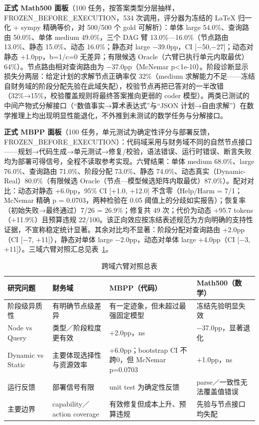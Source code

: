 \textbf{正式 Math500 面板}（100 任务，按答案类型分层抽样，FROZEN\_BEFORE\_EXECUTION，534 次调用，评分器为冻结的 LaTeX 归一化 + sympy 精确等价，对 500/500 个 gold 可解析）：单体 large 54.0\%、查询路由 50.0\%、单体 medium 49.0\%，三个 DAG 臂 13.0\%---16.0\%（节点路由 13.0\%、静态 15.0\%、动态 16.0\%；静态对 large −39.0pp，CI {[}−50,−27{]}；动态对静态 +1.0pp，b=1/c=0 无差异；有限候选 Oracle（六臂已执行单元内取最优）64\%）。节点路由相对查询路由为 −37.0pp（McNemar p\textless1e-10）。阶段诊断显示损失分两层：给定计划的求解节点正确率仅 32\%（medium 求解能力不足------冻结自财务域的阶段分配先验在此域失配），校验节点再把已答对的一半改错（32\%→15\%，校验覆盖规则将最终答案推向更弱的 coder 模型）。两类已测试的中间产物式分解接口（``数值事实→算术表达式''与``JSON 计划→自由求解''）在数学推理上均出现明显性能退化，不外推到未测试的数学任务与分解接口。

\textbf{正式 MBPP 面板}（100 任务，单元测试为确定性评分与部署反馈，FROZEN\_BEFORE\_EXECUTION）：代码域采用与财务域不同的自然节点接口------规划→代码生成→单元测试→修复/校验，语法错误、运行时错误、断言失败均为部署可得信号，全程不读取参考实现。六臂结果：单体 medium 68.0\%、large 76.0\%、查询路由 71.0\%、阶段分配 73.0\%、静态 74.0\%、动态真实（Dynamic-Real）80.0\%（有限候选 Oracle（节点---模型候选矩阵内取最优）87.0\%）。配对对比：动态对静态 +6.0pp，95\% CI {[}+1.0, +12.0{]} 不含零（Help/Harm = 7/1；McNemar 精确 p = 0.0703，两种检验在 0.05 阈值上的分歧如实报告）；恢复率（初始失败→最终通过）7/26 = 26.9\%；修复共 49 次；代价为动态 +95.7 tokens（+11.9\%）且预算违规 22/100。该正向效应按冻结表述规范为方向明确的支持性证据，不宣称稳定统计显著。其余对比均不显著：阶段分配对查询路由 +2.0pp（CI {[}−7, +11{]}），静态对单体 large −2.0pp，动态对单体 large +4.0pp（CI {[}−3, +11{]}）。三域六臂对照汇总见表~\ref{tab:exp4-16}。

\begin{table}[htbp]
\centering\small
\caption{跨域六臂对照总表}
\label{tab:exp4-16}
\begin{tabular}{@{}>{\raggedright\arraybackslash}p{}>{\raggedright\arraybackslash}p{}>{\raggedright\arraybackslash}p{}>{\raggedright\arraybackslash}p{}@{}}
\toprule
研究问题 & 财务域 & MBPP（代码） & Math500（数学） \\
\midrule
阶段级异质性 & 有明确节点级差异 & 有一定迹象，但未超过最强固定模型 & 冻结先验明显失效 \\
Node vs Query & 类型／阶段粒度更有效 & +2.0pp，ns & −37.0pp，显著退化 \\
Dynamic vs Static & 主要体现选择性与资源效率 & +6.0pp；bootstrap CI 不跨0，但 McNemar p=0.0703 & +1.0pp，ns \\
运行反馈 & 部署信号有限 & unit test 为确定性反馈 & parse／一致性无法覆盖值错误 \\
主要边界 & capability／action coverage & 有效修复但成本上升、预算违规 & 先验与节点接口均失配 \\
\bottomrule
\end{tabular}
\end{table}

